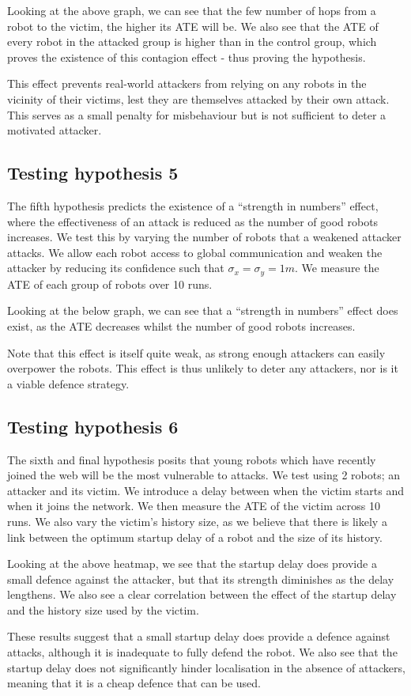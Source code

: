 
Looking at the above graph, we can see that the few number of hops from a robot to the victim, the higher its ATE will be. We also see that the ATE of every robot in the attacked group is higher than in the control group, which proves the existence of this contagion effect - thus proving the hypothesis.

This effect prevents real-world attackers from relying on any robots in the vicinity of their victims, lest they are themselves attacked by their own attack. This serves as a small penalty for misbehaviour but is not sufficient to deter a motivated attacker.

\subsection{Testing hypothesis 5}
The fifth hypothesis predicts the existence of a ``strength in numbers'' effect, where the effectiveness of an attack is reduced as the number of good robots increases. We test this by varying the number of robots that a weakened attacker attacks. We allow each robot access to global communication and weaken the attacker by reducing its confidence such that $\sigma_x = \sigma_y = 1m$.  We measure the ATE of each group of robots over 10 runs.

Looking at the below graph, we can see that a ``strength in numbers'' effect does exist, as the ATE decreases whilst the number of good robots increases. 

Note that this effect is itself quite weak, as strong enough attackers can easily overpower the robots. This effect is thus unlikely to deter any attackers, nor is it a viable defence strategy.

\subsection{Testing hypothesis 6}
The sixth and final hypothesis posits that young robots which have recently joined the web will be the most vulnerable to attacks. We test using 2 robots; an attacker and its victim. We introduce a delay between when the victim starts and when it joins the network. We then measure the ATE of the victim across 10 runs. We also vary the victim's history size, as we believe that there is likely a link between the optimum startup delay of a robot and the size of its history.

Looking at the above heatmap, we see that the startup delay does provide a small defence against the attacker, but that its strength diminishes as the delay lengthens. We also see a clear correlation between the effect of the startup delay and the history size used by the victim.

These results suggest that a small startup delay does provide a defence against attacks, although it is inadequate to fully defend the robot. We also see that the startup delay does not significantly hinder localisation in the absence of attackers, meaning that it is a cheap defence that can be used.

